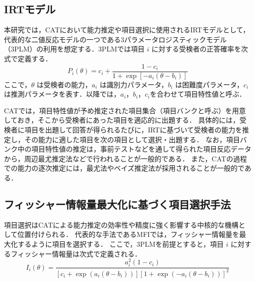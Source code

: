 \documentclass[dvipdfmx,a4j]{jarticle}
\begin{document}
\subsection{IRTモデル}

本研究では，CATにおいて能力推定や項目選択に使用されるIRTモデルとして，代表的な二値反応モデルの一つである3パラメータロジスティックモデル（3PLM）の利用を想定する．3PLMでは項目 $i$ に対する受検者の正答確率を次式で定義する．
\begin{equation}
P_i(\theta) = c_i + \frac{1 - c_i}{1 + \exp[-a_i(\theta - b_i)]}
\end{equation}
ここで，$\theta$ は受検者の能力，$a_i$ は識別力パラメータ，$b_i$ は困難度パラメータ，$c_i$ は推測パラメータを表す．以降では，$a_i$，$b_i$，$c_i$を合わせて項目特性値と呼ぶ．

CATでは，項目特性値が予め推定された項目集合（項目バンクと呼ぶ）を用意しておき，そこから受検者にあった項目を適応的に出題する．
具体的には，受検者に項目を出題して回答が得られるたびに，IRTに基づいて受検者の能力を推定し，その能力に適した項目を次の項目として選択・出題する．
なお，項目バンク中の項目特性値の推定は，事前テストなどを通して得られた項目反応データから，周辺最尤推定法などで行われることが一般的である．
また，CATの過程での能力の逐次推定には，最尤法やベイズ推定法が採用されることが一般的である．


\subsection{フィッシャー情報量最大化に基づく項目選択手法}

項目選択はCATによる能力推定の効率性や精度に強く影響する中核的な機構として位置付けられる．
代表的な手法であるMFIでは，フィッシャー情報量を最大化するように項目を選択する．
ここで，3PLMを前提とすると，項目 $i$ に対するフィッシャー情報量は次式で定義される．
\begin{equation}
I_i(\theta) =
\frac{a_i^2 (1 - c_i)}
{[c_i + \exp(a_i(\theta - b_i))][1 + \exp(-a_i(\theta - b_i))]^2}
\end{equation}
\end{document}
